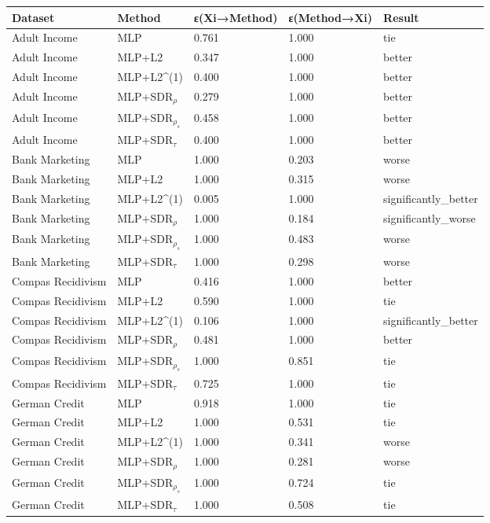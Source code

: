\begin{tabular}{lllll}
\toprule
Dataset & Method & ε(Xi→Method) & ε(Method→Xi) & Result \\
\midrule
Adult Income & MLP & 0.761 & 1.000 & tie \\
Adult Income & MLP+L2 & 0.347 & 1.000 & better \\
Adult Income & MLP+L2^{(1)} & 0.400 & 1.000 & better \\
Adult Income & MLP+SDR$_{\rho}$ & 0.279 & 1.000 & better \\
Adult Income & MLP+SDR$_{\rho_s}$ & 0.458 & 1.000 & better \\
Adult Income & MLP+SDR$_{\tau}$ & 0.400 & 1.000 & better \\
Bank Marketing & MLP & 1.000 & 0.203 & worse \\
Bank Marketing & MLP+L2 & 1.000 & 0.315 & worse \\
Bank Marketing & MLP+L2^{(1)} & 0.005 & 1.000 & significantly_better \\
Bank Marketing & MLP+SDR$_{\rho}$ & 1.000 & 0.184 & significantly_worse \\
Bank Marketing & MLP+SDR$_{\rho_s}$ & 1.000 & 0.483 & worse \\
Bank Marketing & MLP+SDR$_{\tau}$ & 1.000 & 0.298 & worse \\
Compas Recidivism & MLP & 0.416 & 1.000 & better \\
Compas Recidivism & MLP+L2 & 0.590 & 1.000 & tie \\
Compas Recidivism & MLP+L2^{(1)} & 0.106 & 1.000 & significantly_better \\
Compas Recidivism & MLP+SDR$_{\rho}$ & 0.481 & 1.000 & better \\
Compas Recidivism & MLP+SDR$_{\rho_s}$ & 1.000 & 0.851 & tie \\
Compas Recidivism & MLP+SDR$_{\tau}$ & 0.725 & 1.000 & tie \\
German Credit & MLP & 0.918 & 1.000 & tie \\
German Credit & MLP+L2 & 1.000 & 0.531 & tie \\
German Credit & MLP+L2^{(1)} & 1.000 & 0.341 & worse \\
German Credit & MLP+SDR$_{\rho}$ & 1.000 & 0.281 & worse \\
German Credit & MLP+SDR$_{\rho_s}$ & 1.000 & 0.724 & tie \\
German Credit & MLP+SDR$_{\tau}$ & 1.000 & 0.508 & tie \\
\bottomrule
\end{tabular}

